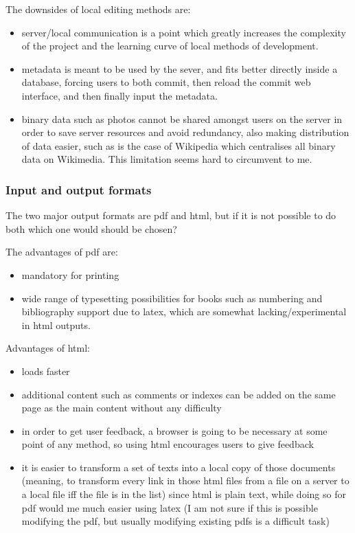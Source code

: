 \documentclass[12pt]{article}
\begin{document}
  The downsides of local editing methods are:
  \begin{itemize}
    \item server/local communication is a point which greatly increases the complexity of the project and the learning curve of local methods of development.
    
    \item metadata is meant to be used by the sever, and fits better directly inside a database, forcing users to both commit, then reload the commit web interface, and then finally input the metadata.
    
    \item binary data such as photos cannot be shared amongst users on the server in order to save server resources and avoid redundancy, also making distribution of data easier, such as is the case of Wikipedia which centralises all binary data on Wikimedia. This limitation seems hard to circumvent to me.
  \end{itemize}
  
  \subsubsection{Input and output formats}
  
  The two major output formats are pdf and html, but if it is not possible to do both which one would should be chosen?
  
  The advantages of pdf are:
  
  \begin{itemize}
    \item mandatory for printing
    \item wide range of typesetting possibilities for books such as numbering and bibliography support due to latex, which are somewhat lacking/experimental in html outputs.
  \end{itemize}
  
  Advantages of html:
  
  \begin{itemize}
    \item loads faster
    \item additional content such as comments or indexes can be added on the same page as the main content without any difficulty
    \item in order to get user feedback, a browser is going to be necessary at some point of any method, so using html encourages users to give feedback
    \item it is easier to transform a set of texts into a local copy of those documents (meaning, to transform every link in those html files from a file on a server to a local file iff the file is in the list) since html is plain text, while doing so for pdf  would me much easier using latex (I am not sure if this is possible modifying the pdf, but usually modifying existing pdfs is a difficult task)
  \end{itemize}
\end{document}
